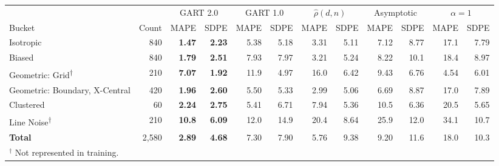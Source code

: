 \begin{tabular}{@{}lrrrrrrrrrrr@{}}
\toprule
 & & \multicolumn{2}{c}{GART 2.0} & \multicolumn{2}{c}{GART 1.0} & \multicolumn{2}{c}{$\hat\rho(d,n)$} & \multicolumn{2}{c}{Asymptotic} & \multicolumn{2}{c}{$\alpha=1$} \\
\cmidrule(lr){3-4}\cmidrule(lr){5-6}\cmidrule(lr){7-8}\cmidrule(lr){9-10}\cmidrule(lr){11-12}
Bucket & Count & MAPE & SDPE & MAPE & SDPE & MAPE & SDPE & MAPE & SDPE & MAPE & SDPE \\
\midrule
Isotropic & 840 & \textbf{1.47} & \textbf{2.23} & 5.38 & 5.18 & 3.31 & 5.11 & 7.12 & 8.77 & 17.1 & 7.79 \\
Biased & 840 & \textbf{1.79} & \textbf{2.51} & 7.93 & 7.97 & 3.21 & 5.24 & 8.22 & 10.1 & 18.4 & 8.97 \\
Geometric: Grid\textsuperscript{$\dagger$} & 210 & \textbf{7.07} & \textbf{1.92} & 11.9 & 4.97 & 16.0 & 6.42 & 9.43 & 6.76 & 4.54 & 6.01 \\
Geometric: Boundary, X-Central & 420 & \textbf{1.96} & \textbf{2.60} & 5.50 & 5.33 & 2.99 & 5.06 & 6.69 & 8.87 & 17.0 & 7.89 \\
Clustered & 60 & \textbf{2.24} & \textbf{2.75} & 5.41 & 6.71 & 7.94 & 5.36 & 10.5 & 6.36 & 20.5 & 5.65 \\
Line Noise\textsuperscript{$\dagger$} & 210 & \textbf{10.8} & \textbf{6.09} & 12.0 & 14.9 & 20.4 & 8.64 & 25.9 & 12.0 & 34.1 & 10.7 \\
\textbf{Total} & 2{,}580 & \textbf{2.89} & \textbf{4.68} & 7.30 & 7.90 & 5.76 & 9.38 & 9.20 & 11.6 & 18.0 & 10.3 \\
\bottomrule
\multicolumn{12}{l}{\footnotesize $^{\dagger}$ Not represented in training.} \\
\end{tabular}